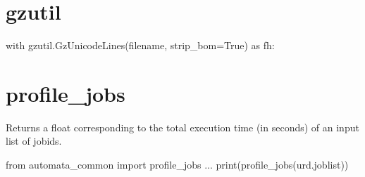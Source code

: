 \section{gzutil}
\begin{python}
with gzutil.GzUnicodeLines(filename, strip_bom=True) as fh:
\end{python}



\section{profile\_jobs}
Returns a float corresponding to the total execution time (in seconds)
of an input list of jobids.
\begin{python}
from automata_common import profile_jobs
...
print(profile_jobs(urd.joblist))
\end{python}

